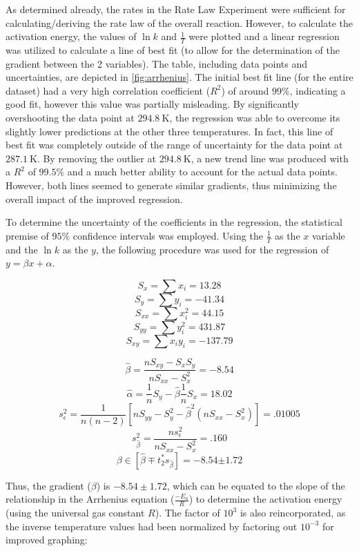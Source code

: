 As determined already, the rates in the Rate Law Experiment were sufficient for calculating/deriving the rate law of the overall reaction. However, to calculate the activation energy, the values of $\ln{k}$ and $\frac{1}{T}$ were plotted and a linear regression was utilized to calculate a line of best fit (to allow for the determination of the gradient between the 2 variables). The table, including data points and uncertainties, are depicted in \cref{fig:arrhenius}. The initial best fit line (for the entire dataset) had a very high correlation coefficient ($R^2$) of around $99\%$, indicating a good fit, however this value was partially misleading. By significantly overshooting the data point at $\SI{294.8}{\kelvin}$, the regression was able to overcome its slightly lower predictions at the other three temperatures. In fact, this line of best fit was completely outside of the range of uncertainty for the data point at $\SI{287.1}{\kelvin}$. By removing the outlier at $\SI{294.8}{\kelvin}$, a new trend line was produced with a $R^2$ of $99.5\%$ and a much better ability to account for the actual data points. However, both lines seemed to generate similar gradients, thus minimizing the overall impact of the improved regression.

To determine the uncertainty of the coefficients in the regression, the statistical premise of $95\%$ confidence intervals was employed. Using the $\frac{1}{T}$ as the $x$ variable and the $\ln{k}$ as the $y$, the following procedure was used for the regression of $y = \beta x + \alpha$.

 \begin{minipage}{.5\linewidth}
  $$S_x = \sum x_i = 13.28$$
  $$S_y = \sum y_i = -41.34$$
  $$S_{xx} = \sum x_i^2 = 44.15$$
  $$S_{yy} = \sum y_i^2 = 431.87$$
  $$S_{xy} = \sum x_iy_i = -137.79$$
 \end{minipage}
  \begin{minipage}{.5\linewidth}
  $$\hat{\beta} = \frac{nS_{xy} - S_xS_y}{nS_{xx} - S_x^2} = -8.54$$
  $$\hat{\alpha} = \frac{1}{n}S_y - \hat{\beta}\frac{1}{n}S_x =  18.02$$
  $$s_{\epsilon}^2 = \frac{1}{n(n-2)}\left[nS_{yy} - S_y^2 - \hat{\beta}^2(nS_{xx} - S_x^2)\right] = .01005$$
  $$s_{\hat{\beta}}^2 = \frac{ns_{\epsilon}^2}{nS_{xx} - S_x^2} = .160$$
  $$\beta \in [\hat{\beta} \mp t_{2}^*s_{\hat{\beta}}] = \bm{-8.54} \bm{\pm} \bm{1.72}$$
 \end{minipage}

 Thus, the gradient ($\beta$) is $-8.54 \pm 1.72$, which can be equated to the slope of the relationship in the Arrhenius equation ($\frac{-E_a}{R}$) to determine the activation energy (using the universal gas constant $R$). The factor of $10^3$ is also reincorporated, as the inverse temperature values had been normalized by factoring out $10^{-3}$ for improved graphing:

